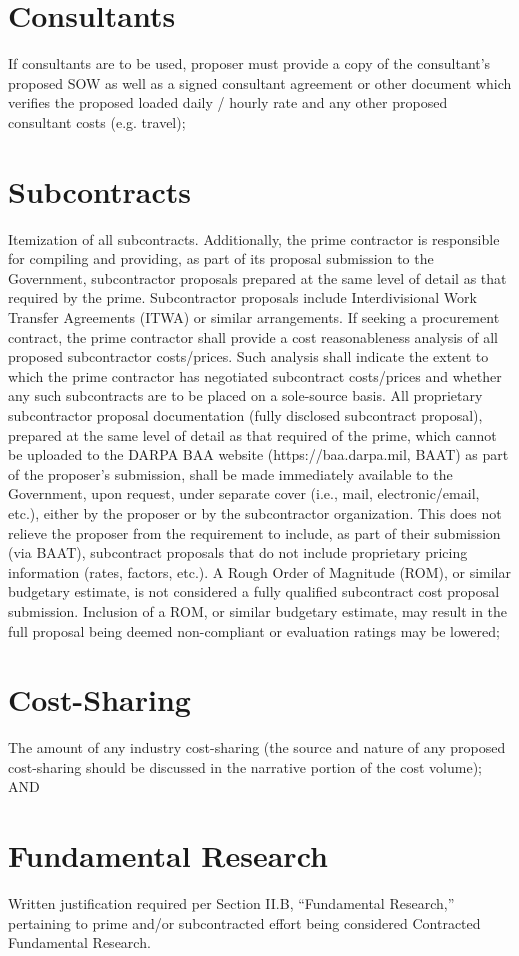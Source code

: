 \section{Consultants}
If consultants are to be used, proposer must provide a copy of the consultant’s proposed
SOW as well as a signed consultant agreement or other document which verifies the
proposed loaded daily / hourly rate and any other proposed consultant costs (e.g. travel);
\section{Subcontracts}
Itemization of all subcontracts. Additionally, the prime contractor is responsible for
compiling and providing, as part of its proposal submission to the Government, subcontractor
proposals prepared at the same level of detail as that required by the prime. Subcontractor
proposals include Interdivisional Work Transfer Agreements (ITWA) or similar
arrangements. If seeking a procurement contract, the prime contractor shall provide a cost
reasonableness analysis of all proposed subcontractor costs/prices. Such analysis shall
indicate the extent to which the prime contractor has negotiated subcontract costs/prices and
whether any such subcontracts are to be placed on a sole-source basis.
All proprietary subcontractor proposal documentation (fully disclosed subcontract proposal),
prepared at the same level of detail as that required of the prime, which cannot be uploaded
to the DARPA BAA website (https://baa.darpa.mil, BAAT) as part of the proposer’s
submission, shall be made immediately available to the Government, upon request, under
separate cover (i.e., mail, electronic/email, etc.), either by the proposer or by the
subcontractor organization. This does not relieve the proposer from the requirement to
include, as part of their submission (via BAAT), subcontract proposals that do not include
proprietary pricing information (rates, factors, etc.).
A Rough Order of Magnitude (ROM), or similar budgetary estimate, is not considered a fully
qualified subcontract cost proposal submission. Inclusion of a ROM, or similar budgetary
estimate, may result in the full proposal being deemed non-compliant or evaluation ratings
may be lowered;
\section{Cost-Sharing}
The amount of any industry cost-sharing (the source and nature of any proposed cost-sharing
should be discussed in the narrative portion of the cost volume); AND
\fi
\section{Fundamental Research}
Written justification required per Section II.B, “Fundamental Research,” pertaining to prime
and/or subcontracted effort being considered Contracted Fundamental Research.

